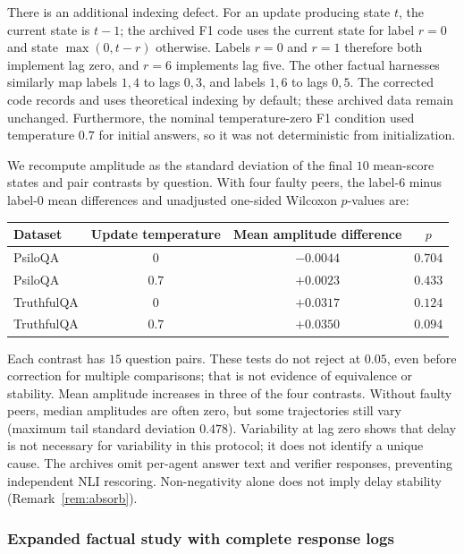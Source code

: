 \documentclass[11pt]{article}
\theoremstyle{definition}
\begin{document}
There is an additional indexing defect. For an update producing state $t$, the current state is
$t-1$; the archived F1 code uses the current state for label $r=0$ and state $\max(0,t-r)$ otherwise.
Labels $r=0$ and $r=1$ therefore both implement lag zero, and $r=6$ implements lag five. The other
factual harnesses similarly map labels $1,4$ to lags $0,3$, and labels $1,6$ to lags $0,5$.
The corrected code records and uses theoretical indexing by default; these archived data remain
unchanged. Furthermore, the nominal temperature-zero F1 condition used temperature $0.7$ for initial
answers, so it was not deterministic from initialization.

We recompute amplitude as the standard deviation of the final $10$ mean-score states and pair
contrasts by question. With four faulty peers, the label-$6$ minus label-$0$ mean differences and
unadjusted one-sided Wilcoxon $p$-values are:
\begin{center}
\begin{tabular}{lccc}
\hline
Dataset & Update temperature & Mean amplitude difference & $p$\\
\hline
PsiloQA & $0$ & $-0.0044$ & $0.704$\\
PsiloQA & $0.7$ & $+0.0023$ & $0.433$\\
TruthfulQA & $0$ & $+0.0317$ & $0.124$\\
TruthfulQA & $0.7$ & $+0.0350$ & $0.094$\\
\hline
\end{tabular}
\end{center}
Each contrast has $15$ question pairs. These tests do not reject at $0.05$, even before correction
for multiple comparisons; that is not evidence of equivalence or stability. Mean amplitude increases
in three of the four contrasts. Without faulty peers, median amplitudes are often zero, but some
trajectories still vary (maximum tail standard deviation $0.478$). Variability at lag zero shows that
delay is not necessary for variability in this protocol; it does not identify a unique cause.
The archives omit per-agent answer text and verifier responses, preventing independent NLI rescoring.
Non-negativity alone does not imply delay stability (Remark~\ref{rem:absorb}).

\subsubsection{Expanded factual study with complete response logs}\label{sec:expanded}
\end{document}
